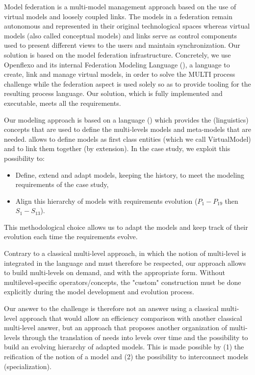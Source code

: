 Model federation is a multi-model management approach based on the use of virtual models and loosely coupled links. The models in a federation remain autonomous and represented in their original technological spaces whereas virtual models (also called conceptual models) and links serve as control components used to present different views to the users and maintain synchronization.
Our solution is based on the model federation infrastructure. Concretely, we use Openflexo and its internal Federation Modeling Language (\FML), a language to create, link and manage virtual models, in order to solve the MULTI process challenge while the federation aspect is used solely so as to provide tooling for the resulting process language. Our solution, which is fully implemented and executable, meets all the requirements.

Our modeling approach is based on a language (\FML) which provides the (linguistics) concepts that are used to define  the multi-levels models and meta-models that are needed. \FML allows to define models as first class entities (which we call VirtualModel) and to link them together (by extension). In the \mpc case study, we exploit this possibility to:
\begin{itemize}
    \item Define, extend and adapt models, keeping the history, to meet the %
    modeling requirements of the case study,
    \item Align this hierarchy of models with requirements evolution ($P_1-P_{19}$ then $S_1-S_{13}$).
\end{itemize}
This methodological choice allows us to adapt the models and keep track of their evolution each time the requirements evolve.

Contrary to a classical multi-level approach, in which the notion of multi-level is integrated in the language and must therefore be respected, our approach allows to build multi-levels on demand, and with the appropriate form. Without multilevel-specific operators/concepts, the "custom" construction must be done explicitly during the model development and evolution process.

Our answer to the challenge is therefore not an answer using a classical multi-level approach that would allow an efficiency comparison with another classical multi-level answer, but an approach that proposes another organization of multi-levels through the translation of needs into levels over time and the possibility to build an evolving hierarchy of adapted models. This is made possible by (1) the reification of the notion of a model and (2) the possibility to interconnect models (specialization).%

